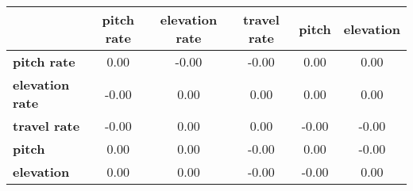 \begin{tiny}\begin{tabular}{|l|c|c|c|c|c|}
\hline
&\textbf{pitch rate}&\textbf{elevation rate}&\textbf{travel rate}&\textbf{pitch}&\textbf{elevation}\\\hline
\textbf{pitch rate}&0.00&-0.00&-0.00&0.00&0.00\\\hline
\textbf{elevation rate}&-0.00&0.00&0.00&0.00&0.00\\\hline
\textbf{travel rate}&-0.00&0.00&0.00&-0.00&-0.00\\\hline
\textbf{pitch}&0.00&0.00&-0.00&0.00&-0.00\\\hline
\textbf{elevation}&0.00&0.00&-0.00&-0.00&0.00\\\hline
\end{tabular}
\end{tiny}